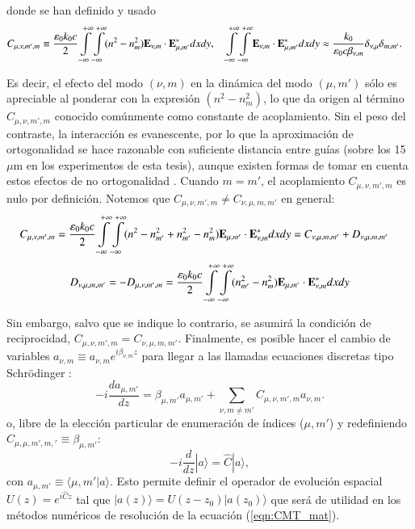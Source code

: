 donde se han definido y usado
\begin{align*}
	   C_{\mu, \nu, m', m} &\equiv \frac{\epsilon_0 k_0 c}{2}\int\displaylimits_{-\infty}^{+\infty}\int\displaylimits_{-\infty}^{+\infty} (n^2 - n^2_{m}) \textbf{E}_{\nu, m} \cdot \textbf{E}_{\mu, m'}^* dxdy , \quad\int\displaylimits_{-\infty}^{+\infty}\int\displaylimits_{-\infty}^{+\infty} \textbf{E}_{\nu, m} \cdot \textbf{E}_{\mu, m'}^* dxdy \approx \frac{k_0}{\epsilon_0 c \beta_{\nu, m}} \delta_{\nu,\mu}\delta_{m,m'}.
\end{align*}

Es decir, el efecto del modo $(\nu, m)$ en la dinámica del modo $(\mu, m')$ sólo es apreciable al ponderar con la expresión $(n^2 - n^2_{m})$, lo que da origen al término $C_{\mu, \nu, m', m}$ conocido comúnmente como constante de acoplamiento. Sin el peso del contraste, la interacción es evanescente, por lo que la aproximación de ortogonalidad se hace razonable con suficiente distancia entre guías (sobre los 15 $\mu$m en los experimentos de esta tesis), aunque existen formas de tomar en cuenta estos efectos de no ortogonalidad \citep{schulz_geometric_2022}. Cuando $m=m'$, el acoplamiento $C_{\mu, \nu, m', m}$ es nulo por definición. Notemos que $C_{\mu, \nu, m', m} \neq C_{\nu, \mu, m, m'}$ en general:
\begin{align*}
	C_{\mu, \nu, m', m} &= \frac{\epsilon_0 k_0 c}{2}\int\displaylimits_{-\infty}^{+\infty}\int\displaylimits_{-\infty}^{+\infty} (n^2 - n^2_{m'} + n^2_{m'} - n^2_{m}) \textbf{E}_{\mu, m'} \cdot \textbf{E}_{\nu, m}^* dxdy = C_{\nu, \mu, m, m'} + D_{\nu, \mu, m, m'}
\end{align*}
\begin{equation*}
 D_{\nu, \mu, m, m'} = -D_{\mu, \nu, m', m} = \frac{\epsilon_0 k_0 c}{2}\int\displaylimits_{-\infty}^{+\infty}\int\displaylimits_{-\infty}^{+\infty} (n^2_{m'}- n^2_{m}) \textbf{E}_{\mu, m'} \cdot \textbf{E}_{\nu, m}^*   dxdy
\end{equation*}

Sin embargo, salvo que se indique lo contrario, se asumirá la condición de reciprocidad, $C_{\mu, \nu, m', m} = C_{\nu, \mu, m, m'}$. Finalmente, es posible hacer el cambio de variables $a_{\nu, m} \equiv a_{\nu, m} e^{i\beta_{\nu, m} z}$ para llegar a las llamadas ecuaciones discretas tipo Schrödinger \cite{discretesolitons, artificialFB, FBdynamics}:
\begin{equation}
	  	 -i\frac{d a_{\mu, m'}}{dz} = \beta_{\mu, m'} a_{\mu, m'} + \sum_{\nu, m\neq m'}C_{\mu, \nu, m', m}   a_{\nu, m}.
	\label{eqn:CMT1}
\end{equation}
o, libre de la elección particular de enumeración de índices ($\mu, m'$) y redefiniendo $C_{\mu, \mu, m', m,'} \equiv \beta_{\mu, m'}$:
\begin{equation}
	-i\frac{d }{d z} |a\rangle  = \hat{C} |a\rangle, \label{eqn:CMT_mat}
\end{equation}
con $a_{\mu, m'} \equiv \langle \mu, m' | a \rangle$. Esto permite definir el operador de evolución espacial $U(z) = e^{i\hat{C}z}$ tal que $|a(z)\rangle=U(z-z_0)|a(z_0)\rangle$ que será de utilidad en los métodos numéricos de resolución de la ecuación (\ref{eqn:CMT_mat}).


